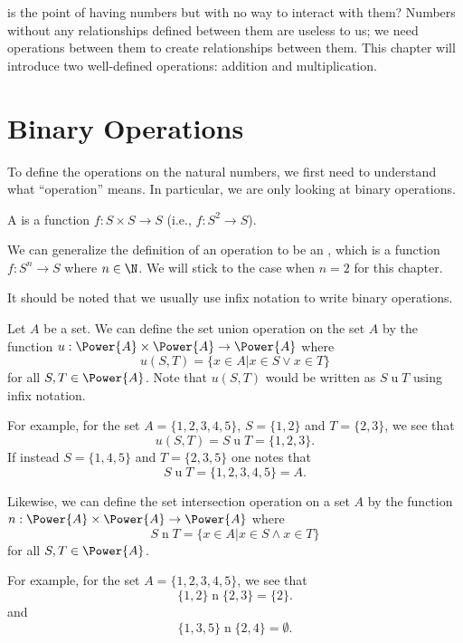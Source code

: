 is the point of having numbers but with no way to interact with them? Numbers without any relationships defined between them are useless to us; we need operations between them to create relationships between them. This chapter will introduce two well-defined operations: addition and multiplication.

\section{Binary Operations}
To define the operations on the natural numbers, we first need to understand what ``operation'' means. In particular, we are only looking at binary operations.

\begin{definition}
    A  is a function $f: S \times S \to S$ (i.e., $f: S^2 \to S$).
\end{definition}
\begin{remark}
    We can generalize the definition of an operation to be an , which is a function $f: S^n \to S$ where $n \in \N$. We will stick to the case when $n = 2$ for this chapter.
\end{remark}

It should be noted that we usually use infix notation to write binary operations.

\begin{example}
    \setlength{\parindent}{1.5em}
    
    Let $A$ be a set. We can define the set union operation on the set $A$ by the function $u: \Power{A} \times \Power{A} \to \Power{A}$ where
    \[
        u(S, T) = \{x \in A \vert x \in S \lor x \in T\}
    \]
    for all $S, T \in \Power{A}$. Note that $u(S, T)$ would be written as $S\mathrel{u}T$ using infix notation.

    For example, for the set $A = \{1, 2, 3, 4, 5\}$, $S = \{1, 2\}$ and $T = \{2, 3\}$, we see that
    \[
        u(S, T) = S\mathrel{u}T = \{1, 2, 3\}.
    \]
    If instead $S = \{1, 4, 5\}$ and $T = \{2, 3, 5\}$ one notes that
    \[
        S\mathrel{u}T = \{1, 2, 3, 4, 5\} = A.
    \]
\end{example}

\begin{example}
    \setlength{\parindent}{1.5em}

    Likewise, we can define the set intersection operation on a set $A$ by the function $n: \Power{A} \times \Power{A} \to \Power{A}$ where
    \[
        S \mathrel{n} T = \{x \in A \vert x \in S \land x \in T\}
    \]
    for all $S, T \in \Power{A}$.

    For example, for the set $A = \{1, 2, 3, 4, 5\}$, we see that
    \[
        \{1,2\}\mathrel{n}\{2,3\} = \{2\}.
    \]
    and
    \[
        \{1, 3, 5\}\mathrel{n}\{2, 4\} = \emptyset.
    \]
\end{example}

